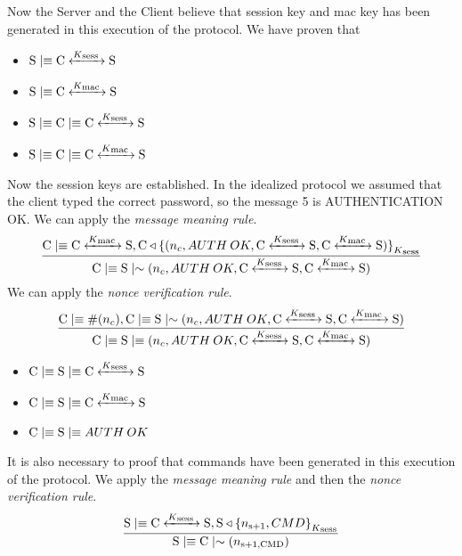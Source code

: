 Now the Server and the Client believe that session key and mac key has been generated in this execution of the protocol. We have proven that
\begin{itemize}
	\item \(\textnormal{S} \mid\equiv \textnormal{C} \xleftrightarrow{K\textsubscript{sess }} \textnormal{S}\)
	\item \(\textnormal{S} \mid\equiv \textnormal{C} \xleftrightarrow{K\textsubscript{mac }} \textnormal{S}\)
	\item \(\textnormal{S} \mid\equiv \textnormal{C} \mid\equiv \textnormal{C} \xleftrightarrow{K\textsubscript{sess }} \textnormal{S}\)
	\item \(\textnormal{S} \mid\equiv \textnormal{C} \mid\equiv \textnormal{C} \xleftrightarrow{K\textsubscript{mac }} \textnormal{S}\)
\end{itemize}
Now the session keys are established. In the idealized protocol we assumed that the client typed the correct password, so the message 5 is AUTHENTICATION OK. We can apply the \textit{message meaning rule}.
\[
	\frac{\textnormal{C} \mid\equiv \textnormal{C} \xleftrightarrow{K\textsubscript{mac }} \textnormal{S}, \textnormal{C} \triangleleft { \{ (n_c,AUTH\:OK,\textnormal{C}\xleftrightarrow{K\textsubscript{sess }}\textnormal{S},\textnormal{C}\xleftrightarrow{K\textsubscript{mac }}\textnormal{S}) \} }_{K\textsubscript{sess}}}
	{\textnormal{C} \mid\equiv \textnormal{S} \mid\sim {(n_c,AUTH\:OK,\textnormal{C}\xleftrightarrow{K\textsubscript{sess }}\textnormal{S},\textnormal{C}\xleftrightarrow{K\textsubscript{mac }}\textnormal{S})}} 
\]
We can apply the \textit{nonce verification rule}.
\[
	\frac{\textnormal{C} \mid\equiv \#(n_c), \textnormal{C} \mid\equiv \textnormal{S} \mid\sim{(n_c,AUTH\:OK,\textnormal{C}\xleftrightarrow{K\textsubscript{sess }}\textnormal{S},\textnormal{C}\xleftrightarrow{K\textsubscript{mac }}\textnormal{S})}}
	{\textnormal{C} \mid\equiv \textnormal{S} \mid\equiv {(n_c,AUTH\:OK,\textnormal{C}\xleftrightarrow{K\textsubscript{sess }}\textnormal{S},\textnormal{C}\xleftrightarrow{K\textsubscript{mac }}\textnormal{S})}} 
\]
\begin{itemize}
	\item \(\textnormal{C} \mid\equiv \textnormal{S} \mid\equiv \textnormal{C} \xleftrightarrow{K\textsubscript{sess }} \textnormal{S}\)
	\item \(\textnormal{C} \mid\equiv \textnormal{S} \mid\equiv \textnormal{C} \xleftrightarrow{K\textsubscript{mac }} \textnormal{S}\)
	\item \(\textnormal{C} \mid\equiv \textnormal{S}\mid\equiv AUTH\:OK\)
\end{itemize}
It is also necessary to proof that commands have been generated in this execution of the protocol. We apply the \textit{message meaning rule} and then the \textit{nonce verification rule}.
\[ \frac{\textnormal{S} \mid\equiv \textnormal{C} \xleftrightarrow{K\textsubscript{sess }} \textnormal{S}, \textnormal{S} \triangleleft { \{ n\textsubscript{s+1},CMD \} }_{K\textsubscript{sess}} }{ \textnormal{S} \mid\equiv \textnormal{C} \mid\sim (n\textsubscript{s+1,CMD}) }\]

